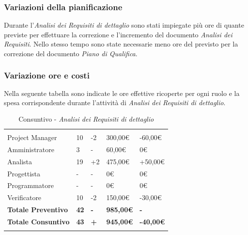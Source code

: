 \subsubsection{Variazioni della pianificazione}
Durante l'\textit{Analisi dei Requisiti di dettaglio} sono stati impiegate più ore di quante previste per effettuare la correzione e l'incremento del documento \textit{Analisi dei Requisiti}. Nello stesso tempo sono state necessarie meno ore del previsto per la correzione del documento \textit{Piano di Qualifica}.
\subsubsection{Variazione ore e costi}
Nella seguente tabella sono indicate le ore effettive ricoperte per ogni ruolo e la spesa corrispondente durante l'attività di \textit{Analisi dei Requisiti di dettaglio}.

\begin{table}[H]
	\centering
	\begin{tabular}{|p{3.8cm}|C{2.6cm}|C{2.9cm}|C{2.7cm}|C{3.3cm}|}
		
		 & & & & \\
		Project Manager  & 10 & -2 & 300,00\euro & -60,00\euro \\
		\hline
		Amministratore& 3 & - & 60,00\euro & 0\euro \\
		\hline
		Analista      & 19 & +2 & 475,00\euro & +50,00\euro \\
		\hline
		Progettista   & -  & - & 0\euro & 0\euro \\
		\hline
		Programmatore & -  & - & 0\euro & 0\euro \\
		\hline
		Verificatore  & 10 & -2 & 150,00\euro & -30,00\euro \\
		\textbf{Totale Preventivo} & \textbf{42} & \textbf{-} & \textbf{985,00\euro} & \textbf{-}\\
		\textbf{Totale Consuntivo} & \textbf{43} & \textbf{+} & \textbf{945,00\euro} & \textbf{-40,00\euro}\\
	\end{tabular}
	\caption{Consuntivo - \textit{Analisi dei Requisiti di dettaglio}}
	
\end{table}

